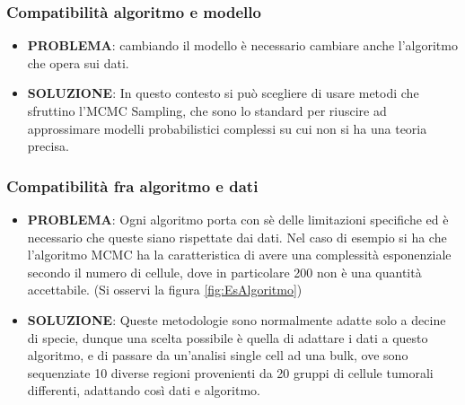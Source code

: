 \documentclass[a4paper]{article}
\begin{document}
	\subsubsection{Compatibilità algoritmo e modello}

	\begin{itemize}
	\item \textbf{PROBLEMA}: cambiando il modello è necessario cambiare anche l'algoritmo che opera sui dati.

	\item \textbf{SOLUZIONE}: In questo contesto si può scegliere di usare metodi che sfruttino l'MCMC Sampling, che sono
	lo standard per riuscire ad approssimare modelli probabilistici complessi su cui non si ha una teoria
	precisa.
	\end{itemize}

	\subsubsection{Compatibilità fra algoritmo e dati}
        
	\begin{itemize}
	\item \textbf{PROBLEMA}: Ogni algoritmo porta con sè delle limitazioni specifiche ed è necessario che
	queste siano rispettate dai dati. Nel caso di esempio si ha che l'algoritmo MCMC ha la caratteristica di
	avere una complessità esponenziale secondo il numero di cellule, dove in particolare 200 non è una quantità accettabile.
	(Si osservi la figura \ref{fig:EsAlgoritmo})
	\item \textbf{SOLUZIONE}: Queste metodologie sono normalmente adatte solo a decine di specie, dunque una scelta
	possibile è quella di adattare i dati a questo algoritmo, e di passare da un'analisi single cell ad una bulk,
	ove sono sequenziate 10 diverse regioni provenienti da 20 gruppi di cellule tumorali differenti, adattando
	così dati e algoritmo.
	\end{itemize}
\end{document}
